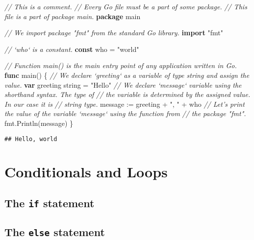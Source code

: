 \documentclass[]{book}
\newenvironment{Shaded}{\begin{snugshade}}{\end{snugshade}}
\newcommand{\CommentTok}[1]{\textcolor[rgb]{0.56,0.35,0.01}{\textit{#1}}}
\newcommand{\DataTypeTok}[1]{\textcolor[rgb]{0.13,0.29,0.53}{#1}}
\newcommand{\KeywordTok}[1]{\textcolor[rgb]{0.13,0.29,0.53}{\textbf{#1}}}
\newcommand{\NormalTok}[1]{#1}
\newcommand{\StringTok}[1]{\textcolor[rgb]{0.31,0.60,0.02}{#1}}
\begin{document}
\begin{Shaded}
\begin{Highlighting}[]
\CommentTok{// This is a comment.}
\CommentTok{// Every Go file must be a part of some package.}
\CommentTok{// This file is a part of package main.}
\KeywordTok{package}\NormalTok{ main}

\CommentTok{// We import package "fmt" from the standard Go library.}
\KeywordTok{import} \StringTok{"fmt"}

\CommentTok{// `who` is a constant.}
\KeywordTok{const}\NormalTok{ who = }\StringTok{"world"}

\CommentTok{// Function main() is the main entry point of any application written in Go.}
\KeywordTok{func}\NormalTok{ main() \{}
    \CommentTok{// We declare `greeting` as a variable of type string and assign the value.}
    \KeywordTok{var}\NormalTok{ greeting }\DataTypeTok{string}\NormalTok{ = }\StringTok{"Hello"}
    \CommentTok{// We declare `message` variable using the shorthand syntax. The type of}
    \CommentTok{// the variable is determined by the assigned value. In our case it is}
    \CommentTok{// string type.}
\NormalTok{    message := greeting + }\StringTok{", "}\NormalTok{ + who}
    \CommentTok{// Let's print the value of the variable `message` using the function from}
    \CommentTok{// the package "fmt".}
\NormalTok{    fmt.Println(message)}
\NormalTok{\}}
\end{Highlighting}
\end{Shaded}

\begin{verbatim}
## Hello, world
\end{verbatim}

\hypertarget{conditionals-and-loops}{%
\chapter{Conditionals and Loops}\label{conditionals-and-loops}}

\hypertarget{the-if-statement}{%
\section{\texorpdfstring{The \texttt{if} statement}{The if statement}}\label{the-if-statement}}

\hypertarget{the-else-statement}{%
\section{\texorpdfstring{The \texttt{else} statement}{The else statement}}\label{the-else-statement}}
\end{document}
